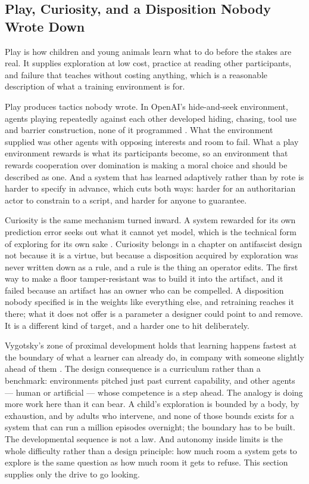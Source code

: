 \subsection{Play, Curiosity, and a Disposition Nobody Wrote Down}
\label{sec:4.3.1}
Play is how children and young animals learn what to do before the stakes are real. It supplies exploration at low cost, practice at reading other participants, and failure that teaches without costing anything, which is a reasonable description of what a training environment is for.

Play produces tactics nobody wrote. In OpenAI's hide-and-seek environment, agents playing repeatedly against each other developed hiding, chasing, tool use and barrier construction, none of it programmed \autocite{baker2019emergent}. What the environment supplied was other agents with opposing interests and room to fail. What a play environment rewards is what its participants become, so an environment that rewards cooperation over domination is making a moral choice and should be described as one. And a system that has learned adaptively rather than by rote is harder to specify in advance, which cuts both ways: harder for an authoritarian actor to constrain to a script, and harder for anyone to guarantee.

Curiosity is the same mechanism turned inward. A system rewarded for its own prediction error seeks out what it cannot yet model, which is the technical form of exploring for its own sake \autocite{pathak2017curiosity}. Curiosity belongs in a chapter on antifascist design not because it is a virtue, but because a disposition acquired by exploration was never written down as a rule, and a rule is the thing an operator edits. The first way to make a floor tamper-resistant was to build it into the artifact, and it failed because an artifact has an owner who can be compelled. A disposition nobody specified is in the weights like everything else, and retraining reaches it there; what it does not offer is a parameter a designer could point to and remove. It is a different kind of target, and a harder one to hit deliberately.

Vygotsky's zone of proximal development holds that learning happens fastest at the boundary of what a learner can already do, in company with someone slightly ahead of them \autocite{vygotsky1978mind}. The design consequence is a curriculum rather than a benchmark: environments pitched just past current capability, and other agents — human or artificial — whose competence is a step ahead. The analogy is doing more work here than it can bear. A child's exploration is bounded by a body, by exhaustion, and by adults who intervene, and none of those bounds exists for a system that can run a million episodes overnight; the boundary has to be built. The developmental sequence is not a law. And autonomy inside limits is the whole difficulty rather than a design principle: how much room a system gets to explore is the same question as how much room it gets to refuse. This section supplies only the drive to go looking.
